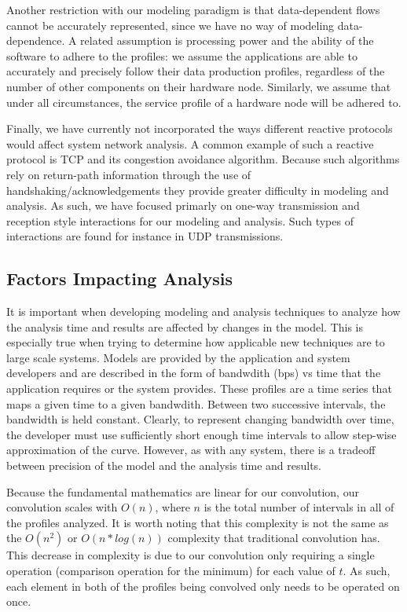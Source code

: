 Another restriction with our modeling paradigm is that data-dependent
flows cannot be accurately represented, since we have no way of
modeling data-dependence.  A related assumption is processing power
and the ability of the software to adhere to the profiles: we assume
the applications are able to accurately and precisely follow their
data production profiles, regardless of the number of other components
on their hardware node.  Similarly, we assume that under all
circumstances, the service profile of a hardware node will be adhered
to.

Finally, we have currently not incorporated the ways different
reactive protocols would affect system network analysis.  A common
example of such a reactive protocol is TCP and its congestion
avoidance algorithm.  Because such algorithms rely on return-path
information through the use of handshaking/acknowledgements they
provide greater difficulty in modeling and analysis.  As such, we have
focused primarly on one-way transmission and reception style
interactions for our modeling and analysis.  Such types of
interactions are found for instance in UDP transmissions.  

\subsection{Factors Impacting Analysis}
\label{subsec:impacts}

It is important when developing modeling and analysis techniques to
analyze how the analysis time and results are affected by changes in
the model.  This is especially true when trying to determine how
applicable new techniques are to large scale systems.  Models are
provided by the application and system developers and are described in
the form of bandwdith (bps) vs time that the application requires or
the system provides.  These profiles are a time series that maps a
given time to a given bandwdith.  Between two successive intervals,
the bandwidth is held constant.  Clearly, to represent changing
bandwidth over time, the developer must use sufficiently short enough
time intervals to allow step-wise approximation of the curve.
However, as with any system, there is a tradeoff between precision of
the model and the analysis time and results.

Because the fundamental mathematics are linear for our convolution,
our convolution scales with $O(n)$, where $n$ is the total
number of intervals in all of the profiles analyzed.  It is worth
noting that this complexity is not the same as the $O(n^2)$ or
$O(n*log(n))$ complexity that traditional convolution has.  This
decrease in complexity is due to our convolution only requiring a
single operation (comparison operation for the minimum) for each value
of $t$.  As such, each element in both of the profiles being
convolved only needs to be operated on once.

